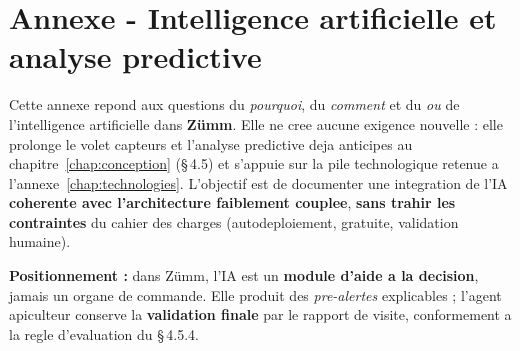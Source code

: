 
\chapter{Annexe - Intelligence artificielle et analyse predictive}
\label{chap:ia}
Cette annexe repond aux questions du \emph{pourquoi}, du \emph{comment} et du
\emph{ou} de l'intelligence artificielle dans \textbf{Z\"umm}. Elle ne cree
aucune exigence nouvelle : elle prolonge le volet capteurs et l'analyse
predictive deja anticipes au chapitre~\ref{chap:conception} (§\,4.5) et
s'appuie sur la pile technologique retenue a l'annexe~\ref{chap:technologies}.
L'objectif est de documenter une integration de l'IA \textbf{coherente avec
l'architecture faiblement couplee}, \textbf{sans trahir les contraintes} du
cahier des charges (autodeploiement, gratuite, validation humaine).

\begin{encadre}
\textbf{Positionnement :} dans Z\"umm, l'IA est un \textbf{module d'aide a la
decision}, jamais un organe de commande. Elle produit des \emph{pre-alertes}
explicables ; l'agent apiculteur conserve la \textbf{validation finale} par le
rapport de visite, conformement a la regle d'evaluation du §\,4.5.4.
\end{encadre}

